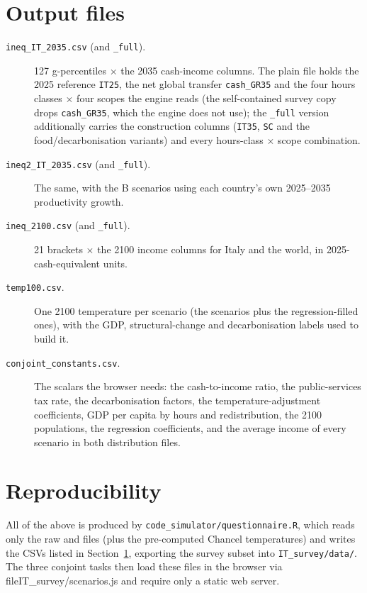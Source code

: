 \documentclass[12pt,a4paper]{article}
\newcommand{\scenario}[1]{\texttt{#1}}
\newcommand{\col}[1]{\texttt{#1}}
\newcommand{\file}[1]{\texttt{#1}}
\begin{document}
\section{Output files}
\label{sec:files}

\begin{description}
  \item[\file{ineq\_IT\_2035.csv} (and \file{\_full}).] 127 g-percentiles $\times$ the 2035 cash-income columns. The plain file holds the 2025 reference \col{IT25}, the net global transfer \col{cash\_GR35} and the four hours classes $\times$ four scopes the engine reads (the self-contained survey copy drops \col{cash\_GR35}, which the engine does not use); the \file{\_full} version additionally carries the construction columns (\col{IT35}, \scenario{SC} and the food/decarbonisation variants) and every hours-class $\times$ scope combination.
  \item[\file{ineq2\_IT\_2035.csv} (and \file{\_full}).] The same, with the B scenarios using each country's own 2025--2035 productivity growth.
  \item[\file{ineq\_2100.csv} (and \file{\_full}).] 21 brackets $\times$ the 2100 income columns for Italy and the world, in 2025-cash-equivalent units.
  \item[\file{temp100.csv}.] One 2100 temperature per scenario (the \citet{Chancel2026} scenarios  plus the regression-filled ones), with the GDP, structural-change and decarbonisation labels used
    to build it.
  \item[\file{conjoint\_constants.csv}.] The scalars the browser needs: the cash-to-income ratio, the public-services tax rate, the decarbonisation factors, the temperature-adjustment coefficients, GDP per capita by hours and redistribution, the 2100 populations, the regression coefficients, and the average income of every scenario in both distribution files.
\end{description}

\section{Reproducibility}
\label{sec:repro}

All of the above is produced by \file{code\_simulator/questionnaire.R}, which reads only the raw \citet{Bothe2026} and \citet{Chancel2026} files (plus the pre-computed Chancel temperatures) and writes the CSVs listed in Section~\ref{sec:files}, exporting the survey subset into \file{IT\_survey/data/}. The three conjoint tasks then load these files in the browser via file{IT\_survey/scenarios.js} and require only a static web server.
\end{document}
